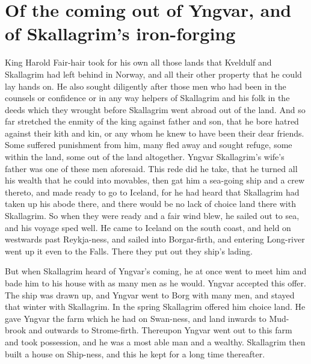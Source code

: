 \chapter{Of the coming out of Yngvar, and of Skallagrim's iron-forging}
King Harold Fair-hair took for his own all those lands that Kveldulf and Skallagrim had left behind in Norway, and all their other property that he could lay hands on. He also sought diligently after those men who had been in the counsels or confidence or in any way helpers of Skallagrim and his folk in the deeds which they wrought before Skallagrim went abroad out of the land. And so far stretched the enmity of the king against father and son, that he bore hatred against their kith and kin, or any whom he knew to have been their dear friends. Some suffered punishment from him, many fled away and sought refuge, some within the land, some out of the land altogether. Yngvar Skallagrim's wife's father was one of these men aforesaid. This rede did he take, that he turned all his wealth that he could into movables, then gat him a sea-going ship and a crew thereto, and made ready to go to Iceland, for he had heard that Skallagrim had taken up his abode there, and there would be no lack of choice land there with Skallagrim. So when they were ready and a fair wind blew, he sailed out to sea, and his voyage sped well. He came to Iceland on the south coast, and held on westwards past Reykja-ness, and sailed into Borgar-firth, and entering Long-river went up it even to the Falls. There they put out they ship's lading.

But when Skallagrim heard of Yngvar's coming, he at once went to meet him and bade him to his house with as many men as he would. Yngvar accepted this offer. The ship was drawn up, and Yngvar went to Borg with many men, and stayed that winter with Skallagrim. In the spring Skallagrim offered him choice land. He gave Yngvar the farm which he had on Swan-ness, and land inwards to Mud-brook and outwards to Strome-firth. Thereupon Yngvar went out to this farm and took possession, and he was a most able man and a wealthy. Skallagrim then built a house on Ship-ness, and this he kept for a long time thereafter.


